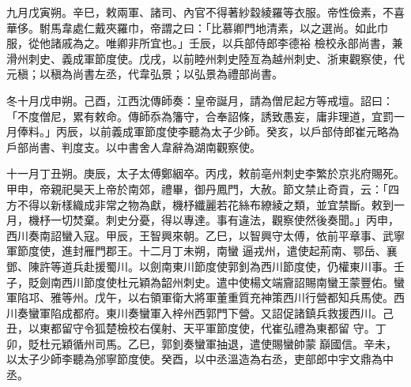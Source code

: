 \begin{pinyinscope}
 九月戊寅朔。辛巳，敕兩軍、諸司、內官不得著紗縠綾羅等衣服。帝性儉素，不喜華侈。駙馬韋處仁戴夾羅巾，帝謂之曰：「比慕卿門地清素，以之選尚。如此巾服，從他諸戚為之。唯卿非所宜也。」壬辰，以兵部侍郎李德裕
 檢校永部尚書，兼滑州刺史、義成軍節度使。戊戌，以前睦州刺史陸亙為越州刺史、浙東觀察使，代元稹；以稹為尚書左丞，代韋弘景；以弘景為禮部尚書。



 冬十月戊申朔。己酉，江西沈傳師奏：皇帝誕月，請為僧尼起方等戒壇。詔曰：「不度僧尼，累有敕命。傳師忝為籓守，合奉詔條，誘致愚妄，庸非理道，宜罰一月俸料。」丙辰，以前義成軍節度使李聽為太子少師。癸亥，以戶部侍郎崔元略為戶部尚書、判度支。以中書舍人韋辭為湖南觀察使。



 十一月丁丑朔。庚辰，太子太傅鄭絪卒。丙戌，敕前亳州刺史李繁於京兆府賜死。甲申，帝親祀昊天上帝於南郊，禮畢，御丹鳳門，大赦。節文禁止奇貢，云：「四方不得以新樣織成非常之物為獻，機杼纖麗若花絲布繚綾之類，並宜禁斷。敕到一月，機杼一切焚棄。刺史分憂，得以專達。事有違法，觀察使然後奏聞。」丙申，西川奏南詔蠻入寇。甲辰，王智興來朝。乙巳，以智興守太傅，依前平章事、武寧軍節度使，進封雁門郡王。十二月丁未朔，南蠻
 逼戎州，遣使起荊南、鄂岳、襄鄧、陳許等道兵赴援蜀川。以劍南東川節度使郭釗為西川節度使，仍權東川事。壬子，貶劍南西川節度使杜元穎為韶州刺史。遣中使楊文端齎詔賜南蠻王蒙豐佑。蠻軍陷邛、雅等州。戊午，以右領軍衛大將軍董重質充神策西川行營都知兵馬使。西川奏蠻軍陷成都府。東川奏蠻軍入梓州西郭門下營。又詔促諸鎮兵救援西川。己丑，以東都留守令狐楚檢校右僕射、天平軍節度使，代崔弘禮為東都留
 守。丁卯，貶杜元穎循州司馬。乙巳，郭釗奏蠻軍抽退，遣使賜蠻帥蒙巔國信。辛未，以太子少師李聽為邠寧節度使。癸酉，以中丞溫造為右丞，吏部郎中宇文鼎為中丞。



\end{pinyinscope}